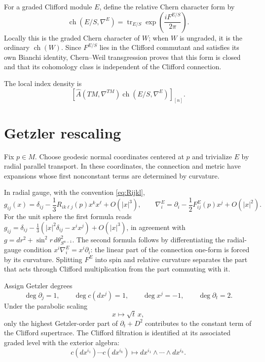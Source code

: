 \documentclass[11pt,oneside,reqno]{book}
\newcommand{\Ahat}{\widehat A}
\theoremstyle{plain}
\theoremstyle{definition}
\theoremstyle{remark}
\begin{document}
For a graded Clifford module \(E\), define the relative Chern character
form by
\[
 \operatorname{ch}(E/S,\nabla^E)
 =
 \operatorname{tr}_{E/S}
 \exp\!\left(\frac{iF^{E/S}}{2\pi}\right).
\]
Locally this is the graded Chern character of \(W\); when \(W\) is
ungraded, it is the ordinary \(\operatorname{ch}(W)\).  Since
\(F^{E/S}\) lies in the Clifford commutant and satisfies its own Bianchi
identity, Chern--Weil transgression proves that this form is closed and that
its cohomology class is independent of the Clifford connection.

The local index density is
\[
 \left[
 \Ahat(TM,\nabla^{TM})
 \operatorname{ch}(E/S,\nabla^E)
 \right]_{[n]}.
\]

\section{Getzler rescaling}

Fix \(p\in M\). Choose geodesic normal coordinates centered at \(p\) and
trivialize \(E\) by radial parallel transport. In these coordinates,
the connection and metric have expansions whose first nonconstant terms
are determined by curvature.

In radial gauge, with the convention \eqref{eq:Rijkl},
\[
 g_{ij}(x)=\delta_{ij}-\frac13R_{ik\ell j}(p)x^kx^\ell+O(|x|^3),
\qquad
 \nabla_i^E
 =\partial_i-\frac12F^E_{ij}(p)x^j+O(|x|^2).
\]
For the unit sphere the first formula reads
\(g_{ij}=\delta_{ij}-\frac13(|x|^2\delta_{ij}-x^ix^j)+O(|x|^3)\), in
agreement with \(g=dr^2+\sin^2r\,d\theta^2_{S^{n-1}}\).
The second formula follows by differentiating the radial-gauge condition
\(x^i\nabla_i^E=x^i\partial_i\): the linear part of the connection one-form
is forced by its curvature. Splitting \(F^E\) into spin and relative
curvature separates the part that acts through Clifford multiplication
from the part commuting with it.

Assign Getzler degrees
\[
 \deg\partial_j=1,\qquad
 \deg c(dx^j)=1,\qquad
 \deg x^j=-1,\qquad
 \deg\partial_t=2.
\]
Under the parabolic scaling
\[
 x\mapsto\sqrt t\,x,
\]
only the highest Getzler-order part of \(\partial_t+D^2\) contributes to
the constant term of the Clifford supertrace. The Clifford filtration is
identified at its associated graded level with the exterior algebra:
\[
 c(dx^{i_1})\cdots c(dx^{i_k})
 \longmapsto
 dx^{i_1}\wedge\cdots\wedge dx^{i_k}.
\]
\end{document}
